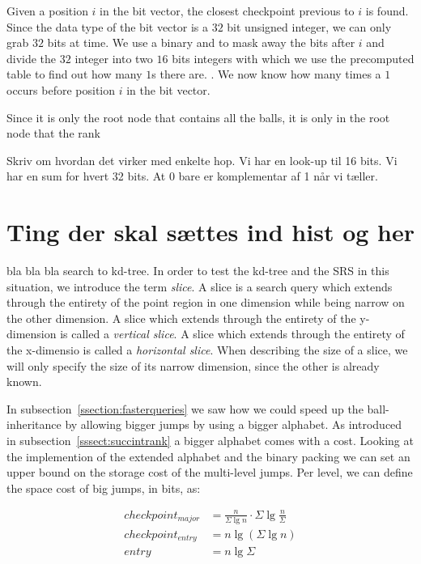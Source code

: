 Given a position $i$ in the bit vector, the closest checkpoint previous to $i$ is found. Since the data type of the bit vector is a $32$ bit unsigned integer, we can only grab $32$ bits at time. We use a binary and to mask away the bits after $i$ and divide the $32$ integer into two $16$ bits integers with which we use the precomputed table to find out how many $1$s there are. . We now know how many times a $1$ occurs before position $i$ in the bit vector.

Since it is only the root node that contains all the balls, it is only in the root node that the rank 


Skriv om hvordan det virker med enkelte hop. Vi har en look-up til 16 bits. Vi har en sum for hvert 32 bits. At 0 bare er komplementar af 1 når vi tæller.


\section{Ting der skal sættes ind hist og her}

bla bla bla search to kd-tree. In order to test the kd-tree and the SRS in this situation, we introduce the term \emph{slice}. A slice is a search query which extends through the entirety of the point region  in one dimension while being narrow on the other dimension. A slice which extends through the entirety of the y-dimension is called a \emph{vertical slice}. A slice which extends through the entirety of the x-dimensio is called a \emph{horizontal slice}. When describing the size of a slice, we will only specify the size of its narrow dimension, since the other is already known.

In subsection~\ref{ssection:fasterqueries} we saw how we could speed up the ball-inheritance by allowing bigger jumps by using a bigger alphabet. As introduced in subsection~\ref{sssect:succintrank} a bigger alphabet comes with a cost. Looking at the implemention of the extended alphabet and the binary packing we can set an upper bound on the storage cost of the multi-level jumps. Per level, we can define the space cost of big jumps, in bits, as:

\begin{align*}
  checkpoint_{major} &= \frac{n}{\Sigma \lg n} \cdot \Sigma \lg \frac{n}{\Sigma} \\
  checkpoint_{entry} &= n \lg (\Sigma \lg n) \\
  entry &= n \lg \Sigma
\end{align*}


